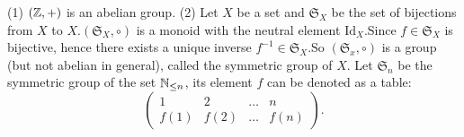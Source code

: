 \documentclass{book}
\numberwithin{equation}{section}
\begin{document}
\begin{exampleenv}
    \quad
    \newline
    (1) $(\mathbb{Z}, +)$ is an abelian group.
    \newline
    (2) Let $X$ be a set and $\mathfrak{S}_X$ be the set of bijections from $X$ to $X$.$(\mathfrak{S}_X , \circ)$ is a monoid with the neutral element $\mathrm{Id}_X$.Since $f\in \mathfrak{S}_X $ is bijective,  hence there exists a unique inverse $f^{-1}\in \mathfrak{S} _X$.So $(\mathfrak{S} _x, \circ)$ is a group (but not abelian in general), called the symmetric group of $X$.
    \newline
    Let $\mathfrak{S} _n$ be the symmetric group of the set $\mathbb{N}_{\le n}$,  its element $f$ can be denoted as a table:
    $$\begin{pmatrix}
  1&2  &\dots &n \\
  f(1)& f(2) &\dots   &f(n)
\end{pmatrix}.$$
\end{exampleenv}
\end{document}

